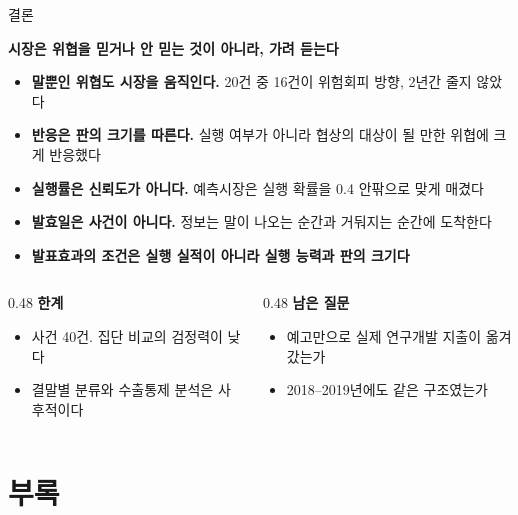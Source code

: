 \documentclass[aspectratio=169,9pt,t]{beamer}
\newcommand{\msg}[1]{{\fontsize{11.5}{15}\selectfont\bfseries\color{navy}\RaggedRight #1\par}\vspace{2.0mm}}
\newcommand{\lab}[1]{{\fontsize{8.4}{10.5}\selectfont\bfseries\color{crim}#1}}
\begin{document}
\begin{frame}{결론}
\msg{시장은 위협을 믿거나 안 믿는 것이 아니라, 가려 듣는다}
\begin{itemize}
\item \textbf{말뿐인 위협도 시장을 움직인다.} 20건 중 16건이 위험회피 방향, 2년간 줄지 않았다
\item \textbf{반응은 판의 크기를 따른다.} 실행 여부가 아니라 협상의 대상이 될 만한 위협에 크게 반응했다
\item \textbf{실행률은 신뢰도가 아니다.} 예측시장은 실행 확률을 0.4 안팎으로 맞게 매겼다
\item \textbf{발효일은 사건이 아니다.} 정보는 말이 나오는 순간과 거둬지는 순간에 도착한다
\item \textbf{발표효과의 조건은 실행 실적이 아니라 실행 능력과 판의 크기다}
\end{itemize}
\vspace{1.5mm}
\begin{columns}[T,onlytextwidth]
\begin{column}{0.48\textwidth}
\lab{한계}
\begin{itemize}
\item 사건 40건. 집단 비교의 검정력이 낮다
\item 결말별 분류와 수출통제 분석은 사후적이다
\end{itemize}
\end{column}
\begin{column}{0.48\textwidth}
\lab{남은 질문}
\begin{itemize}
\item 예고만으로 실제 연구개발 지출이 옮겨 갔는가
\item 2018--2019년에도 같은 구조였는가
\end{itemize}
\end{column}
\end{columns}
\end{frame}

\appendix
\section{부록}
\end{document}
